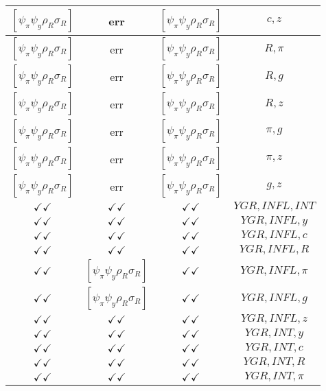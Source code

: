 \documentclass[a4paper,10pt]{article}
\begin{document}
\begin{longtable}{|c|c|c|c|}
\hline
$[\psi_\pi \psi_y \rho_R \sigma_R ]$ & err & $[\psi_\pi \psi_y \rho_R \sigma_R ]$ & ${c},{z}$ \\
\hline
$[\psi_\pi \psi_y \rho_R \sigma_R ]$ & err & $[\psi_\pi \psi_y \rho_R \sigma_R ]$ & ${R},{\pi}$ \\
\hline
$[\psi_\pi \psi_y \rho_R \sigma_R ]$ & err & $[\psi_\pi \psi_y \rho_R \sigma_R ]$ & ${R},{g}$ \\
\hline
$[\psi_\pi \psi_y \rho_R \sigma_R ]$ & err & $[\psi_\pi \psi_y \rho_R \sigma_R ]$ & ${R},{z}$ \\
\hline
$[\psi_\pi \psi_y \rho_R \sigma_R ]$ & err & $[\psi_\pi \psi_y \rho_R \sigma_R ]$ & ${\pi},{g}$ \\
\hline
$[\psi_\pi \psi_y \rho_R \sigma_R ]$ & err & $[\psi_\pi \psi_y \rho_R \sigma_R ]$ & ${\pi},{z}$ \\
\hline
$[\psi_\pi \psi_y \rho_R \sigma_R ]$ & err & $[\psi_\pi \psi_y \rho_R \sigma_R ]$ & ${g},{z}$ \\
\hline
$\checkmark\checkmark$ & $\checkmark\checkmark$ & $\checkmark\checkmark$ & ${YGR},{INFL},{INT}$ \\
\hline
$\checkmark\checkmark$ & $\checkmark\checkmark$ & $\checkmark\checkmark$ & ${YGR},{INFL},{y}$ \\
\hline
$\checkmark\checkmark$ & $\checkmark\checkmark$ & $\checkmark\checkmark$ & ${YGR},{INFL},{c}$ \\
\hline
$\checkmark\checkmark$ & $\checkmark\checkmark$ & $\checkmark\checkmark$ & ${YGR},{INFL},{R}$ \\
\hline
$\checkmark\checkmark$ & $[\psi_\pi \psi_y \rho_R \sigma_R ]$ & $\checkmark\checkmark$ & ${YGR},{INFL},{\pi}$ \\
\hline
$\checkmark\checkmark$ & $[\psi_\pi \psi_y \rho_R \sigma_R ]$ & $\checkmark\checkmark$ & ${YGR},{INFL},{g}$ \\
\hline
$\checkmark\checkmark$ & $\checkmark\checkmark$ & $\checkmark\checkmark$ & ${YGR},{INFL},{z}$ \\
\hline
$\checkmark\checkmark$ & $\checkmark\checkmark$ & $\checkmark\checkmark$ & ${YGR},{INT},{y}$ \\
\hline
$\checkmark\checkmark$ & $\checkmark\checkmark$ & $\checkmark\checkmark$ & ${YGR},{INT},{c}$ \\
\hline
$\checkmark\checkmark$ & $\checkmark\checkmark$ & $\checkmark\checkmark$ & ${YGR},{INT},{R}$ \\
\hline
$\checkmark\checkmark$ & $\checkmark\checkmark$ & $\checkmark\checkmark$ & ${YGR},{INT},{\pi}$ \\

\end{longtable}
\end{document}

